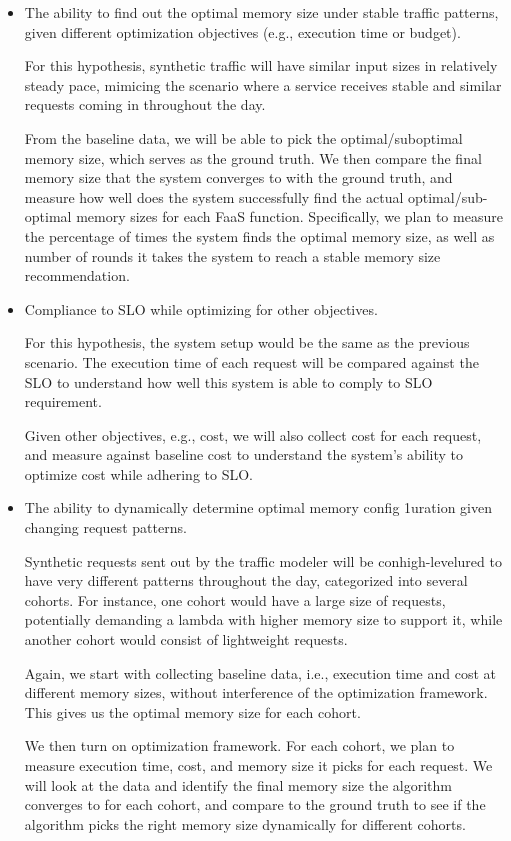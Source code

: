 \documentclass[conference]{IEEEtran}
\begin{document}
\begin{itemize}
\item The ability to find out the optimal memory size under stable traffic patterns, given different optimization objectives (e.g., execution time or budget).

For this hypothesis, synthetic traffic will have similar input sizes in relatively steady pace, mimicing the scenario where a service receives stable and similar requests coming in throughout the day. 

From the baseline data, we will be able to pick the optimal/suboptimal memory size, which serves as the ground truth. We then compare the final memory size that the system converges to with the ground truth, and measure how well does the system successfully find the actual optimal/sub-optimal memory sizes for each FaaS function. Specifically, we plan to measure the percentage of times the system finds the optimal memory size, as well as number of rounds it takes the system to reach a stable memory size recommendation.

\item Compliance to SLO while optimizing for other objectives.

For this hypothesis, the system setup would be the same as the previous scenario. The execution time of each request will be compared against the SLO to understand how well this system is able to comply to SLO requirement.

Given other objectives, e.g., cost, we will also collect cost for each request, and measure against baseline cost to understand the system's ability to optimize cost while adhering to SLO.


\item The ability to dynamically determine optimal memory config 1uration given changing request patterns.

Synthetic requests sent out by the traffic modeler will be conhigh-levelured to have very different patterns throughout the day, categorized into several cohorts. For instance, one cohort would have a large size of requests, potentially demanding a lambda with higher memory size to support it, while another cohort would consist of lightweight requests. 

Again, we start with collecting baseline data, i.e., execution time and cost at different memory sizes, without interference of the optimization framework. This gives us the optimal memory size for each cohort.

We then turn on optimization framework. For each cohort, we plan to measure execution time, cost, and memory size it picks for each request. We will look at the data and identify the final memory size the algorithm converges to for each cohort, and compare to the ground truth to see if the algorithm picks the right memory size dynamically for different cohorts.


\end{itemize}
\end{document}
